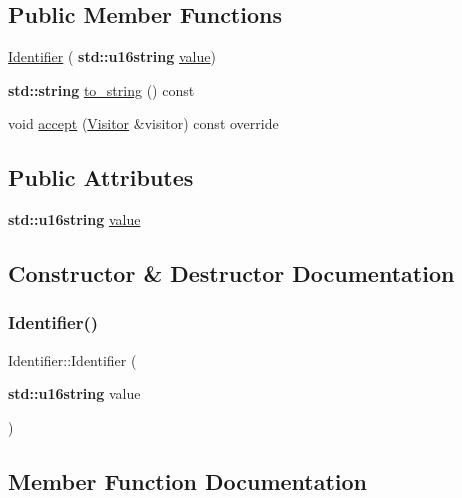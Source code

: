 \subsection*{Public Member Functions}
\begin{DoxyCompactItemize}
\item 
\hyperlink{struct_identifier_a7b446d6b561512e0ee273f29b1e95581}{Identifier} (\textbf{ std\+::u16string} \hyperlink{struct_identifier_a1deb747305d88d9ccac5137a65838d63}{value})
\item 
\textbf{ std\+::string} \hyperlink{struct_identifier_a86c253d449b695548284efd85ec2be4e}{to\+\_\+string} () const
\item 
void \hyperlink{struct_identifier_acc1d00e56e626c8398b4e995578d6769}{accept} (\hyperlink{struct_visitor}{Visitor} \&visitor) const override
\end{DoxyCompactItemize}
\subsection*{Public Attributes}
\begin{DoxyCompactItemize}
\item 
\textbf{ std\+::u16string} \hyperlink{struct_identifier_a1deb747305d88d9ccac5137a65838d63}{value}
\end{DoxyCompactItemize}


\subsection{Constructor \& Destructor Documentation}
\mbox{\label{struct_identifier_a7b446d6b561512e0ee273f29b1e95581}} 
\subsubsection{\texorpdfstring{Identifier()}{Identifier()}}
{\footnotesize\ttfamily Identifier\+::\+Identifier (\begin{DoxyParamCaption}\item[{\textbf{ std\+::u16string}}]{value }\end{DoxyParamCaption})\hspace{0.3cm}{\ttfamily [inline]}}



\subsection{Member Function Documentation}
\mbox{\label{struct_identifier_acc1d00e56e626c8398b4e995578d6769}} 

